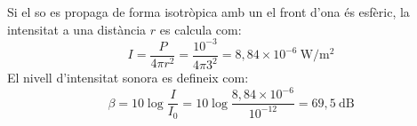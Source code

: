 \begin{solapartat}
 Si el so es propaga de forma isotròpica amb un el front d'ona és esfèric, la intensitat a una distància $r$ es calcula com:
\[ I = \frac{P}{4\pi r^2} = \frac{10^{-3}}{4\pi 3^2} = 8,84\times 10^{-6}\ \mathrm{W/m^2} \]
 El nivell d'intensitat sonora es defineix com:
\[ \beta = 10\log\frac{I}{I_0} = 10\log\frac{8,84\times 10^{-6}}{10^{-12}} = 69,5\ \mathrm{dB} \]
\end{solapartat}

